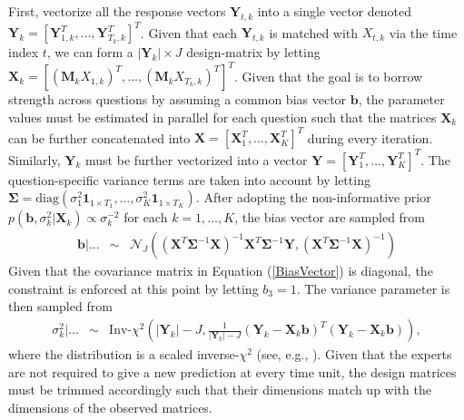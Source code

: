 \documentclass[aoas, preprint]{imsart}
\numberwithin{equation}{section}
\theoremstyle{plain}
\begin{document}
\begin{center}
\end{center}
First, vectorize all the response vectors $\boldsymbol{Y}_{t,k}$ into a single vector denoted $\boldsymbol{Y}_k = \left[\boldsymbol{Y}_{1,k}^T, \dots, \boldsymbol{Y}_{T_k,k}^T\right]^T$. Given that each $\boldsymbol{Y}_{t,k}$ is matched with $X_{t,k}$ via the time index $t$, we can form a $|\boldsymbol{Y}_k| \times J$ design-matrix by letting $\boldsymbol{X}_k = \left[ (\boldsymbol{M}_kX_{1,k})^T, \dots, (\boldsymbol{M}_kX_{T_k,k})^T \right]^T$. Given that the goal is to borrow strength across questions by assuming a common bias vector $\boldsymbol{b}$, the parameter values must be estimated in parallel for each question such that the matrices $\boldsymbol{X}_k$ can be further concatenated into $\boldsymbol{X} = [\boldsymbol{X}_1^T, \dots, \boldsymbol{X}_K^T]^T$ during every iteration. Similarly, $\boldsymbol{Y}_k$ must be further vectorized into a vector $\boldsymbol{Y} = [\boldsymbol{Y}_1^T, \dots, \boldsymbol{Y}_K^T]^T$. The question-specific variance terms are taken into account by letting $\boldsymbol{\Sigma} = \text{diag}(\sigma^2_1 \boldsymbol{1}_{1 \times T_1}, \dots, \sigma^2_K \boldsymbol{1}_{1 \times T_K})$.  After adopting the non-informative prior $p(\boldsymbol{b}, \sigma_k^2 | \boldsymbol{X}_k) \propto \sigma_k^{-2}$ for each $k = 1, \dots, K$, the bias vector are sampled from
\begin{eqnarray}
\boldsymbol{b} | \dots &\sim& \mathcal{N}_J \left( (\boldsymbol{X}^T \boldsymbol{\Sigma}^{-1} \boldsymbol{X})^{-1} \boldsymbol{X}^T \boldsymbol{\Sigma}^{-1} \boldsymbol{Y}, (\boldsymbol{X}^T \boldsymbol{\Sigma}^{-1} \boldsymbol{X})^{-1} \right) \label{BiasVector}
\end{eqnarray}
Given that the covariance matrix in Equation (\ref{BiasVector}) is diagonal, the constraint is enforced at this point by letting $b_3 = 1$. The variance parameter is then sampled from
\begin{eqnarray*}
\sigma^2_k | \dots &\sim& \text{Inv-}\chi^2\left(|\boldsymbol{Y}_k| - J, \frac{1}{|\boldsymbol{Y}_k| - J} (\boldsymbol{Y}_k - \boldsymbol{X}_k \boldsymbol{b})^T (\boldsymbol{Y}_k - \boldsymbol{X}_k \boldsymbol{b}) \right),
\end{eqnarray*}
where the distribution is a scaled inverse-$\chi^2$ (see, e.g., \citet{gelman2003bayesian}). Given that the experts are not required to give a new prediction at every time unit, the design matrices must be trimmed accordingly such that their dimensions match up with the dimensions of the observed matrices. 
\end{document}
